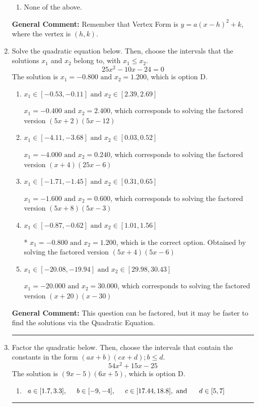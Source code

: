 \documentclass{extbook}[14pt]
\newcommand{\litem}[1]{\item #1

\rule{\textwidth}{0.4pt}}
\begin{document}
\begin{enumerate}
{\begin{enumerate}[label=\Alph*.]
\item None of the above.\end{enumerate}
\textbf{General Comment:} Remember that Vertex Form is $y = a(x-h)^2+k$, where the vertex is $(h, k)$.
}
\litem{
Solve the quadratic equation below. Then, choose the intervals that the solutions $x_1$ and $x_2$ belong to, with $x_1 \leq x_2$.
\[ 25x^{2} -10 x -24 = 0 \]The solution is \( x_1 = -0.800 \text{ and } x_2 = 1.200 \), which is option D.\begin{enumerate}[label=\Alph*.]
\item \( x_1 \in [-0.53, -0.11] \text{ and } x_2 \in [2.39, 2.69] \)

$x_1 = -0.400 \text{ and } x_2 = 2.400$, which corresponds to solving the factored version $(5x + 2)(5x -12)$
\item \( x_1 \in [-4.11, -3.68] \text{ and } x_2 \in [0.03, 0.52] \)

$x_1 = -4.000 \text{ and } x_2 = 0.240$, which corresponds to solving the factored version $(x + 4)(25x -6)$
\item \( x_1 \in [-1.71, -1.45] \text{ and } x_2 \in [0.31, 0.65] \)

$x_1 = -1.600 \text{ and } x_2 = 0.600$, which corresponds to solving the factored version $(5x + 8)(5x -3)$
\item \( x_1 \in [-0.87, -0.62] \text{ and } x_2 \in [1.01, 1.56] \)

* $x_1 = -0.800 \text{ and } x_2 = 1.200$, which is the correct option. Obtained by solving the factored version $(5x + 4)(5x -6)$
\item \( x_1 \in [-20.08, -19.94] \text{ and } x_2 \in [29.98, 30.43] \)

$x_1 = -20.000 \text{ and } x_2 = 30.000$, which corresponds to solving the factored version $(x + 20)(x -30)$
\end{enumerate}

\textbf{General Comment:} This question can be factored, but it may be faster to find the solutions via the Quadratic Equation.
}
\litem{
Factor the quadratic below. Then, choose the intervals that contain the constants in the form $(ax+b)(cx+d); b \leq d.$
\[ 54x^{2} +15 x -25 \]The solution is \( (9x -5)(6x + 5) \), which is option D.\begin{enumerate}[label=\Alph*.]
\item \( a \in [1.7, 3.3], \hspace*{5mm} b \in [-9, -4], \hspace*{5mm} c \in [17.44, 18.8], \text{ and } \hspace*{5mm} d \in [5, 7] \)


\end{enumerate}}
\end{enumerate}
\end{document}
